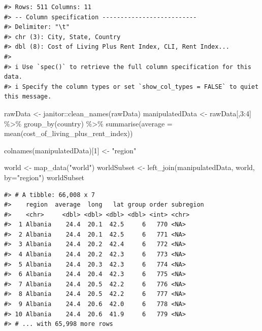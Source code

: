 \documentclass[
  11pt,
  a4paper,
  twoside]{scrbook}
\newenvironment{Shaded}{\begin{snugshade}}{\end{snugshade}}
\newcommand{\AttributeTok}[1]{\textcolor[rgb]{0.77,0.63,0.00}{#1}}
\newcommand{\DecValTok}[1]{\textcolor[rgb]{0.00,0.00,0.81}{#1}}
\newcommand{\FunctionTok}[1]{\textcolor[rgb]{0.00,0.00,0.00}{#1}}
\newcommand{\NormalTok}[1]{#1}
\newcommand{\OtherTok}[1]{\textcolor[rgb]{0.56,0.35,0.01}{#1}}
\newcommand{\SpecialCharTok}[1]{\textcolor[rgb]{0.00,0.00,0.00}{#1}}
\newcommand{\StringTok}[1]{\textcolor[rgb]{0.31,0.60,0.02}{#1}}
\begin{document}
\linespread{1}

\begin{verbatim}
#> Rows: 511 Columns: 11
#> -- Column specification --------------------------
#> Delimiter: "\t"
#> chr (3): City, State, Country
#> dbl (8): Cost of Living Plus Rent Index, CLI, Rent Index...
#> 
#> i Use `spec()` to retrieve the full column specification for this data.
#> i Specify the column types or set `show_col_types = FALSE` to quiet this message.
\end{verbatim}

\linespread{1}

\begin{Shaded}
\begin{Highlighting}[]
\NormalTok{rawData }\OtherTok{\textless{}{-}}\NormalTok{ janitor}\SpecialCharTok{::}\FunctionTok{clean\_names}\NormalTok{(rawData)}
\NormalTok{manipulatedData }\OtherTok{\textless{}{-}}\NormalTok{ rawData[,}\DecValTok{3}\SpecialCharTok{:}\DecValTok{4}\NormalTok{] }\SpecialCharTok{\%\textgreater{}\%} \FunctionTok{group\_by}\NormalTok{(country) }\SpecialCharTok{\%\textgreater{}\%} \FunctionTok{summarise}\NormalTok{(}\AttributeTok{average =} \FunctionTok{mean}\NormalTok{(cost\_of\_living\_plus\_rent\_index))}

\FunctionTok{colnames}\NormalTok{(manipulatedData)[}\DecValTok{1}\NormalTok{] }\OtherTok{\textless{}{-}} \StringTok{"region"}

\NormalTok{world }\OtherTok{\textless{}{-}} \FunctionTok{map\_data}\NormalTok{(}\StringTok{"world"}\NormalTok{)}
\NormalTok{worldSubset }\OtherTok{\textless{}{-}} \FunctionTok{left\_join}\NormalTok{(manipulatedData, world, }\AttributeTok{by=}\StringTok{"region"}\NormalTok{)}
\NormalTok{worldSubset}
\end{Highlighting}
\end{Shaded}

\linespread{1}

\begin{verbatim}
#> # A tibble: 66,008 x 7
#>    region  average  long   lat group order subregion
#>    <chr>     <dbl> <dbl> <dbl> <dbl> <int> <chr>    
#>  1 Albania    24.4  20.1  42.5     6   770 <NA>     
#>  2 Albania    24.4  20.1  42.5     6   771 <NA>     
#>  3 Albania    24.4  20.2  42.4     6   772 <NA>     
#>  4 Albania    24.4  20.2  42.3     6   773 <NA>     
#>  5 Albania    24.4  20.3  42.3     6   774 <NA>     
#>  6 Albania    24.4  20.4  42.3     6   775 <NA>     
#>  7 Albania    24.4  20.5  42.2     6   776 <NA>     
#>  8 Albania    24.4  20.5  42.2     6   777 <NA>     
#>  9 Albania    24.4  20.6  42.0     6   778 <NA>     
#> 10 Albania    24.4  20.6  41.9     6   779 <NA>     
#> # ... with 65,998 more rows
\end{verbatim}
\end{document}
